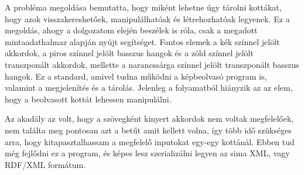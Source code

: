 
A probléma megoldása bemutatta, hogy miként lehetne úgy tárolni kottákat, hogy azok visszakereshetőek, manipulálhatóak és létrehozhatóak legyenek. Ez a megoldás, ahogy a dolgozatom elején beszélek is róla, csak a megadott mintaadathalmaz alapján nyújt segítséget. Fontos elemek a kék színnel jelölt akkordok, a piros színnel jelölt basszus hangok és a zöld színnel jelölt transzponált akkordok, mellette a narancssárga színnel jelölt transzponált basszus hangok. Ez a standard, amivel tudna működni a képbeolvasó program is, valamint a megjelenítés és a tárolás. Jelenleg a folyamatból hiányzik az az elem, hogy a beolvasott kottát lehessen manipulálni.

Az akadály az volt, hogy a szövegként kinyert akkordok nem voltak megfelelőek, nem találta meg pontosan azt a betűt amit kellett volna, így több idő szükséges arra, hogy kitapasztalhassam a megfelelő inputokat egy-egy kottánál. Ebben tud még fejlődni ez a program, és képes lesz szerializálni legyen az sima XML, vagy RDF/XML formátum.

